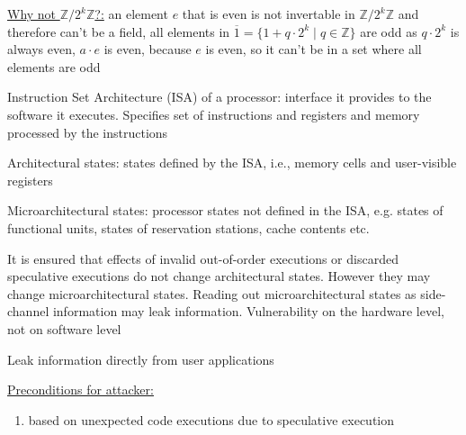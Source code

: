\documentclass[landscape, a4paper]{article}
\begin{document}
\begin{minipage}[t]{0.2\linewidth}
\begin{betterlist}
\begin{betterlist}
			\item \underline{Why not $\mathbb{Z}/2^k\mathbb{Z}$?:} an element $e$ that is even is not invertable in $\mathbb{Z}/2^k\mathbb{Z}$ and therefore can't be a field, all elements in $\overline{1} = \{1 + q\cdot 2^k \mid q\in \mathbb{Z}\}$ are odd as $q\cdot 2^k$ is always even, $a\cdot e$ is even, because $e$ is even, so it can't be in a set where all elements are odd
		\end{betterlist}
	\end{betterlist}
	\begin{betterlist}
		\item \alert{Instruction Set Architecture (ISA) of a processor:} interface it provides to the software it executes. Specifies set of instructions and registers and memory processed by the instructions
		\item \alert{Architectural states:} states defined by the ISA, i.e., memory cells and user-visible registers
		\item \alert{Microarchitectural states:} processor states not defined in the ISA, e.g. states of functional units, states of reservation stations, cache contents etc.
		\item It is ensured that effects of invalid out-of-order executions or discarded speculative executions do not change architectural states. However they may change microarchitectural states. Reading out microarchitectural states as side-channel information may leak information. Vulnerability on the hardware level, not on software level
	\end{betterlist}
	\begin{betterlist}
		\item Leak information directly from user applications
		\item \underline{Preconditions for attacker:}
		\begin{enumerate}
			\item based on unexpected code executions due to speculative execution
\end{enumerate}
\end{betterlist}
\end{minipage}
\end{document}

